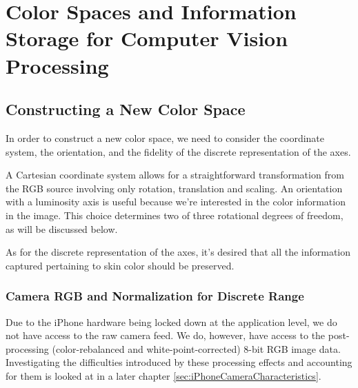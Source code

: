 

\chapter{Color Spaces and Information Storage for Computer Vision Processing} \label{sec:Chap2}

\ifpdf
    \graphicspath{{Chapter2/Figs/Raster/}{Chapter2/Figs/PDF/}{Chapter2/Figs/}}
\else
    \graphicspath{{Chapter2/Figs/Vector/}{Chapter2/Figs/}}
\fi


\section{Constructing a New Color Space}\label{sec:ConstructingANewColorSpace}

In order to construct a new color space, we need to consider the coordinate system, the orientation, and the fidelity of the discrete representation of the axes.

A Cartesian coordinate system allows for a straightforward transformation from the RGB source involving only rotation, translation and scaling. An orientation with a luminosity axis is useful because we're interested in the color information in the image. This choice determines two of three rotational degrees of freedom, as will be discussed below.

As for the discrete representation of the axes, it's desired that all the information captured pertaining to skin color should be preserved.

\subsection{Camera RGB and Normalization for Discrete Range}\label{sec:CameraRGB}

Due to the iPhone hardware being locked down at the application level, we do not have access to the raw camera feed. We do, however, have access to the post-processing (color-rebalanced and white-point-corrected) 8-bit RGB image data. Investigating the difficulties introduced by these processing effects and accounting for them is looked at in a later chapter  \ref{sec:iPhoneCameraCharacteristics}.

